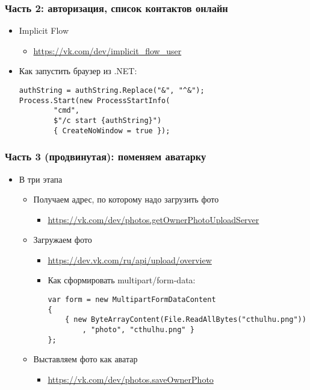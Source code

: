 \documentclass{../../slides-style}
\begin{document}
    \begin{frame}[fragile]
        \frametitle{Часть 2: авторизация, список контактов онлайн}
        \begin{itemize}
            \item Implicit Flow
            \begin{itemize}
                \item \url{https://vk.com/dev/implicit_flow_user}
            \end{itemize}
            \item Как запустить браузер из .NET:
            \begin{verbatim}
authString = authString.Replace("&", "^&");
Process.Start(new ProcessStartInfo(
        "cmd", 
        $"/c start {authString}") 
        { CreateNoWindow = true });
            \end{verbatim}
        \end{itemize}
    \end{frame}

    \begin{frame}[fragile]
        \frametitle{Часть 3 (продвинутая): поменяем аватарку}
        \begin{itemize}
            \item В три этапа
            \begin{itemize}
                \item Получаем адрес, по которому надо загрузить фото 
                \begin{itemize}
                    \item \url{https://vk.com/dev/photos.getOwnerPhotoUploadServer}
                \end{itemize}
                \item Загружаем фото
                \begin{itemize}
                    \item \url{https://dev.vk.com/ru/api/upload/overview}
                    \item Как сформировать multipart/form-data:
                    \begin{verbatim}
var form = new MultipartFormDataContent
{
    { new ByteArrayContent(File.ReadAllBytes("cthulhu.png"))
        , "photo", "cthulhu.png" }
};
                    \end{verbatim}
                \end{itemize}
                \item Выставляем фото как аватар
                \begin{itemize}
                    \item \url{https://vk.com/dev/photos.saveOwnerPhoto}
                \end{itemize}
            \end{itemize}
        \end{itemize}
    \end{frame}
\end{document}

